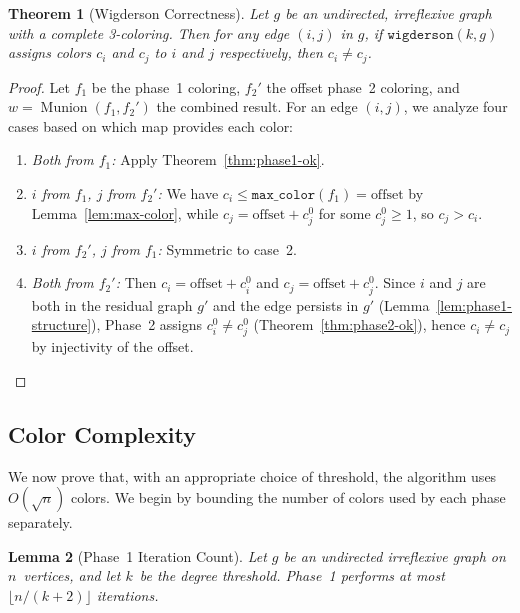 \documentclass[11pt]{article}
\theoremstyle{plain}
\newtheorem{theorem}{Theorem}[section]
\newtheorem{lemma}[theorem]{Lemma}
\theoremstyle{definition}
\theoremstyle{remark}
\newcommand{\Munion}{\operatorname{Munion}}
\begin{document}
\begin{theorem}[Wigderson Correctness]
\label{thm:wigderson-ok}
Let $g$ be an undirected, irreflexive graph with a complete 3-coloring. Then for any edge $(i,j)$ in $g$,
if $\texttt{wigderson}(k, g)$ assigns colors $c_i$ and $c_j$ to $i$ and $j$ respectively, then $c_i \neq c_j$.
\end{theorem}

\begin{proof}
Let $f_1$ be the phase~1 coloring, $f_2'$ the offset phase~2 coloring, and $w = \Munion(f_1, f_2')$ the combined result. For an edge $(i,j)$, we analyze four cases based on which map provides each color:

\begin{enumerate}[nosep]
  \item \emph{Both from $f_1$:} Apply Theorem~\ref{thm:phase1-ok}.

  \item \emph{$i$ from $f_1$, $j$ from $f_2'$:} We have $c_i \le \texttt{max\_color}(f_1) = \text{offset}$ by Lemma~\ref{lem:max-color}, while $c_j = \text{offset} + c_j^0$ for some $c_j^0 \ge 1$, so $c_j > c_i$.

  \item \emph{$i$ from $f_2'$, $j$ from $f_1$:} Symmetric to case~2.

  \item \emph{Both from $f_2'$:} Then $c_i = \text{offset} + c_i^0$ and $c_j = \text{offset} + c_j^0$. Since $i$ and $j$ are both in the residual graph $g'$ and the edge persists in $g'$ (Lemma~\ref{lem:phase1-structure}), Phase~2 assigns $c_i^0 \neq c_j^0$ (Theorem~\ref{thm:phase2-ok}), hence $c_i \neq c_j$ by injectivity of the offset.
\end{enumerate}
\end{proof}

\subsection{Color Complexity}

We now prove that, with an appropriate choice of threshold, the algorithm uses
$O(\!\sqrt{n})$ colors.
We begin by bounding the number of colors used by each phase separately.

\begin{lemma}[Phase~1 Iteration Count]
\label{lem:phase1-steps}
Let $g$ be an undirected irreflexive graph on $n$~vertices, and let $k$~be the
degree threshold.
Phase~1 performs at most $\lfloor n/(k{+}2) \rfloor$ iterations.
\end{lemma}
\end{document}

